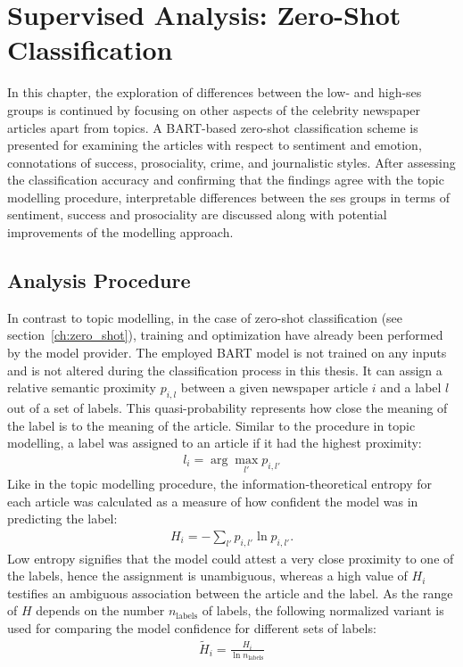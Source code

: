 \renewcommand{\imagepath}{../70-supervised/img}

\chapter{Supervised Analysis: Zero-Shot Classification}\label{ch:supervised}
In this chapter, the exploration of differences between the low- and high-\gls{ses} groups is continued by focusing on other aspects of the celebrity newspaper articles apart from topics. A BART-based zero-shot classification scheme is presented for examining the articles with respect to sentiment and emotion, connotations of success, prosociality, crime, and journalistic styles. After assessing the classification accuracy and confirming that the findings agree with the topic modelling procedure, interpretable differences between the \gls{ses} groups in terms of sentiment, success and prosociality are discussed along with potential improvements of the modelling approach.

\section{Analysis Procedure}
In contrast to topic modelling, in the case of zero-shot classification (see section~\ref{ch:zero_shot}), training and optimization have already been performed by the model provider. The employed BART model is not trained on any inputs and is not altered during the classification process in this thesis. It can assign a relative semantic proximity $p_{i, l}$ between a given newspaper article $i$ and a label $l$ out of a set of labels. This quasi-probability represents how close the meaning of the label is to the meaning of the article. Similar to the procedure in topic modelling, a label was assigned to an article if it had the highest proximity:
\begin{align}
    l_{i} = \arg \max_{l'} p_{i, l'}
\end{align}
Like in the topic modelling procedure, the information-theoretical entropy \autocite{gray_entropy_2013} for each article was calculated as a measure of how confident the model was in predicting the label:
\begin{align}
    H_i = -\sum_{l'} p_{i, l'} \ln p_{i, l'}.
\end{align}
Low entropy signifies that the model could attest a very close proximity to one of the labels, hence the assignment is unambiguous, whereas a high value of $H_i$ testifies an ambiguous association between the article and the label. As the range of $H$ depends on the number $n_\text{labels}$ of labels, the following normalized variant is used for comparing the model confidence for different sets of labels:
\begin{align}
    \widetilde{H}_i = \frac{H_i}{\ln n_\text{labels}}
\end{align}

